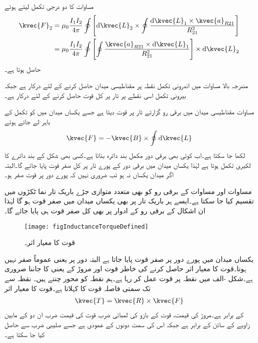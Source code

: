 مساوات  کا دو درجی تکمل لیتے ہوئے
\begin{gather}
 \begin{aligned}\label{مساوات_امالہ_تاروں_کے_مابین_قوت}
\kvec{F}_2 &=\mu_0 \frac{I_1 I_2}{4\pi } \oint\left[\dif \kvec{L}_2 \times \oint\frac{\dif \kvec{L}_1 \times \kvec{a}_{R21}}{R_{21}^2}\right]\\
&=\mu_0 \frac{I_1 I_2}{4\pi } \oint\left[ \oint\frac{ \kvec{a}_{R21}\times \dif \kvec{L}_1}{R_{21}^2}\right] \times \dif \kvec{L}_2
\end{aligned}
\end{gather}
حاصل ہوتا ہے۔

مندرجہ بالا مساوات میں اندرونی تکمل نقطہ  پر مقناطیسی میدان حاصل کرنے کے لئے درکار ہے جبکہ بیرونی تکمل اسی نقطے پر تار پر کل قوت حاصل کرنے کے لئے درکار ہے۔

مساوات   مقناطیسی میدان میں برقی رو گزارتے تار پر قوت دیتا ہے جسے یکساں میدان میں  کو تکمل کے باہر لے جاتے ہوئے
\begin{align*}
\kvec{F}=-\kvec{B} \times \oint \dif \kvec{L}
\end{align*}
 لکھا جا سکتا ہے۔اب کوئی بھی برقی دور مکمل بند دائرہ بناتا ہے۔کسی بھی شکل کے بند دائرے  کا لکیری تکمل  ہوتا ہے لہٰذا یکساں میدان میں برقی دور کے پورے تار پر کل صفر قوت پایا جائے گا۔البتہ اگر میدان یکساں نہ ہو تب ضروری نہیں کہ پورے دور پر قوت صفر ہو۔

مساوات  اور مساوات  کے برقی رو کو بھی متعدد متوازی جڑے باریک تار نما ٹکڑوں میں تقسیم کیا جا سکتا ہے۔ایسے ہر باریک تار پر بھی یکساں میدان میں صفر قوت ہو گا لہٰذا ان اشکال کے برقی رو کے ادوار پر بھی کل صفر قوت ہی پایا جائے گا۔
\begin{figure}
\centering
\texttt{[image: figInductanceTorqueDefined]}
\caption{قوت کا معیار اثر۔}
\label{شکل_امالہ_قوت_کا_معیار_اثر_تعریف}
\end{figure}

یکساں میدان میں پورے دور پر صفر قوت پایا جاتا ہے البتہ دور پر  یعنی  عموماً صفر نہیں ہوتا۔قوت کا معیار اثر حاصل کرنے کی خاطر قوت اور مروڑ کے  یعنی  کا جاننا ضروری ہے۔شکل -الف میں نقطہ  پر قوت  عمل کر رہا ہے۔ہم نقطہ  کو محور چنتے ہیں۔ نقطہ  سے  تک سمتی فاصلہ  قوت کا   کہلاتا ہے۔قوت کا معیار اثر 
\begin{align}
\kvec{T}=\kvec{R} \times \kvec{F}
\end{align}
کے برابر ہے۔مروڑ کی قیمت، قوت کے بازو کی لمبائی ضرب قوت کی قیمت ضرب ان دو کے مابین زاویے کے سائن کے برابر ہے جبکہ اس کی سمت دونوں کے عمودی ہے جسے صلیبی ضرب سے حاصل کیا جا سکتا ہے۔

